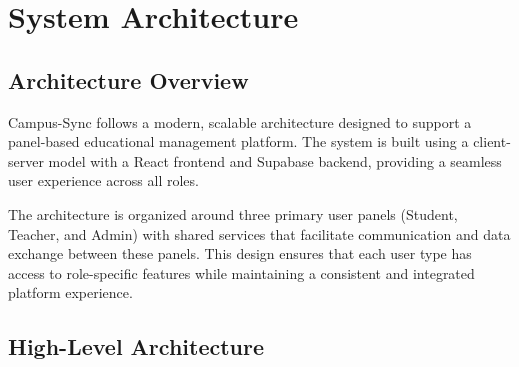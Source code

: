 \chapter{System Architecture}

\section{Architecture Overview}

Campus-Sync follows a modern, scalable architecture designed to support a panel-based educational management platform. The system is built using a client-server model with a React frontend and Supabase backend, providing a seamless user experience across all roles.

The architecture is organized around three primary user panels (Student, Teacher, and Admin) with shared services that facilitate communication and data exchange between these panels. This design ensures that each user type has access to role-specific features while maintaining a consistent and integrated platform experience.

\section{High-Level Architecture}


